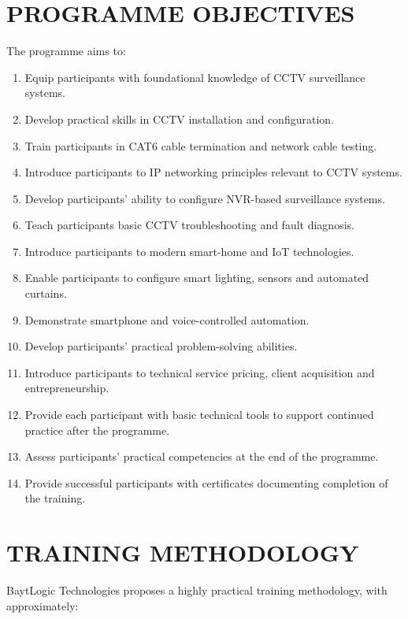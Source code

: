 \documentclass[11pt,a4paper]{article}
\begin{document}
\section{PROGRAMME OBJECTIVES}
The programme aims to:
\begin{enumerate}
    \item Equip participants with foundational knowledge of CCTV surveillance systems.
    \item Develop practical skills in CCTV installation and configuration.
    \item Train participants in CAT6 cable termination and network cable testing.
    \item Introduce participants to IP networking principles relevant to CCTV systems.
    \item Develop participants' ability to configure NVR-based surveillance systems.
    \item Teach participants basic CCTV troubleshooting and fault diagnosis.
    \item Introduce participants to modern smart-home and IoT technologies.
    \item Enable participants to configure smart lighting, sensors and automated curtains.
    \item Demonstrate smartphone and voice-controlled automation.
    \item Develop participants' practical problem-solving abilities.
    \item Introduce participants to technical service pricing, client acquisition and entrepreneurship.
    \item Provide each participant with basic technical tools to support continued practice after the programme.
    \item Assess participants' practical competencies at the end of the programme.
    \item Provide successful participants with certificates documenting completion of the training.
\end{enumerate}

\section{TRAINING METHODOLOGY}
BaytLogic Technologies proposes a highly practical training methodology, with approximately:
\end{document}
